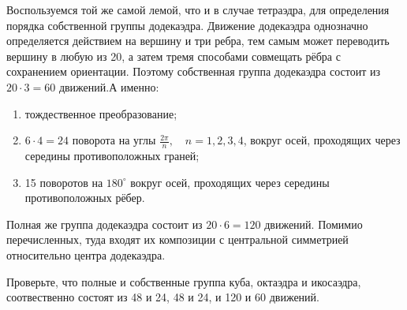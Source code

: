 Воспользуемся той же самой лемой, что и в случае тетраэдра, для определения порядка собственной группы додекаэдра. Движение додекаэдра однозначно определяется действием на вершину и три ребра, тем самым может переводить вершину в любую из 20, а затем тремя способами совмещать рёбра с сохранением ориентации. Поэтому собственная группа додекаэдра состоит из $20 \cdot 3 = 60$ движений.А именно: \begin{enumerate}
    \item тождественное преобразование;
    \item $6 \cdot 4 = 24$ поворота на углы $\frac{2\pi}{n}, \quad n=1,2,3,4$, вокруг осей, проходящих через середины противоположных граней;
    \item 15 поворотов на $180^\circ$ вокруг осей, проходящих через середины противоположных рёбер.
\end{enumerate}

Полная же группа додекаэдра состоит из $20 \cdot 6 = 120$ движений. Помимио перечисленных, туда входят их композиции с центральной симметрией относительно центра додекаэдра.

\begin{practice}
    Проверьте, что полные и собственные группа куба, октаэдра и икосаэдра, соотвественно состоят из 48 и 24, 48 и 24, и 120 и 60 движений.
\end{practice}
